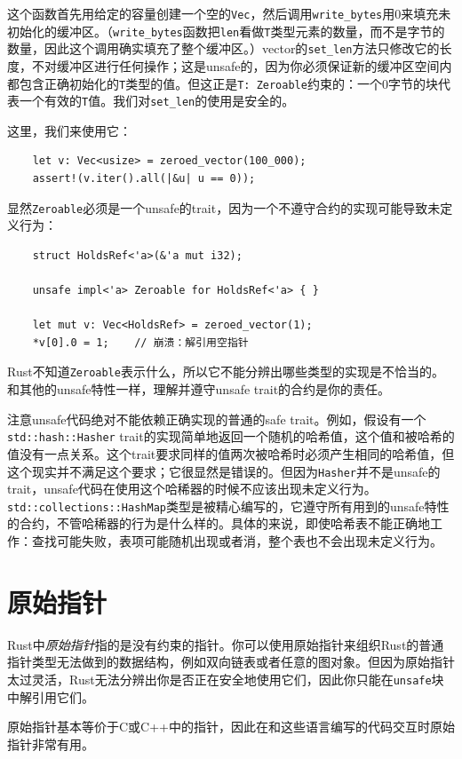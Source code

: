 这个函数首先用给定的容量创建一个空的\texttt{Vec}，然后调用\texttt{write\_bytes}用0来填充未初始化的缓冲区。（\texttt{write\_bytes}函数把\texttt{len}看做\texttt{T}类型元素的数量，而不是字节的数量，因此这个调用确实填充了整个缓冲区。）vector的\texttt{set\_len}方法只修改它的长度，不对缓冲区进行任何操作；这是unsafe的，因为你必须保证新的缓冲区空间内都包含正确初始化的\texttt{T}类型的值。但这正是\texttt{T: Zeroable}约束的：一个0字节的块代表一个有效的\texttt{T}值。我们对\texttt{set\_len}的使用是安全的。

这里，我们来使用它：
\begin{verbatim}
    let v: Vec<usize> = zeroed_vector(100_000);
    assert!(v.iter().all(|&u| u == 0));
\end{verbatim}

显然\texttt{Zeroable}必须是一个unsafe的trait，因为一个不遵守合约的实现可能导致未定义行为：
\begin{verbatim}
    struct HoldsRef<'a>(&'a mut i32);

    unsafe impl<'a> Zeroable for HoldsRef<'a> { }

    let mut v: Vec<HoldsRef> = zeroed_vector(1);
    *v[0].0 = 1;    // 崩溃：解引用空指针
\end{verbatim}

Rust不知道\texttt{Zeroable}表示什么，所以它不能分辨出哪些类型的实现是不恰当的。和其他的unsafe特性一样，理解并遵守unsafe trait的合约是你的责任。

注意unsafe代码绝对不能依赖正确实现的普通的safe trait。例如，假设有一个\texttt{std::hash::Hasher} trait的实现简单地返回一个随机的哈希值，这个值和被哈希的值没有一点关系。这个trait要求同样的值两次被哈希时必须产生相同的哈希值，但这个现实并不满足这个要求；它很显然是错误的。但因为\texttt{Hasher}并不是unsafe的trait，unsafe代码在使用这个哈稀器的时候不应该出现未定义行为。\texttt{std::collections::HashMap}类型是被精心编写的，它遵守所有用到的unsafe特性的合约，不管哈稀器的行为是什么样的。具体的来说，即使哈希表不能正确地工作：查找可能失败，表项可能随机出现或者消，整个表也不会出现未定义行为。

\section{原始指针}\label{rawp}
Rust中\emph{原始指针}指的是没有约束的指针。你可以使用原始指针来组织Rust的普通指针类型无法做到的数据结构，例如双向链表或者任意的图对象。但因为原始指针太过灵活，Rust无法分辨出你是否正在安全地使用它们，因此你只能在\texttt{unsafe}块中解引用它们。

原始指针基本等价于C或C++中的指针，因此在和这些语言编写的代码交互时原始指针非常有用。

